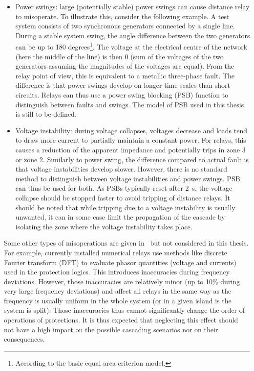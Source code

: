 \begin{itemize}
\begin{figure}
    \label{fig:encroachment}
\end{figure}
    \item Power swings: large (potentially stable) power swings can cause distance relay to misoperate. To illustrate this, consider the following example. A test system consists of two synchronous generators connected by a single line. During a stable system swing, the angle difference between the two generators can be up to 180 degrees\footnote{According to the basic equal area criterion model.}. The voltage at the electrical centre of the network (here the middle of the line) is then 0 (sum of the voltages of the two generators assuming the magnitudes of the voltages are equal). From the relay point of view, this is equivalent to a metallic three-phase fault. The difference is that power swings develop on longer time scales than short-circuits. Relays can thus use a power swing blocking (PSB) function to distinguish between faults and swings. The model of PSB used in this thesis is still to be defined.
    \item Voltage instability: during voltage collapses, voltages decrease and loads tend to draw more current to partially maintain a constant power. For relays, this causes a reduction of the apparent impedance and potentially trips in zone 3 or zone 2. Similarly to power swing, the difference compared to actual fault is that voltage instabilities develop slower. However, there is no standard method to distinguish between voltage instabilities and power swings. PSB can thus be used for both. As PSBs typically reset after 2~s, the voltage collapse should be stopped faster to avoid tripping of distance relays. It should be noted that while tripping due to a voltage instability is usually unwanted, it can in some case limit the propagation of the cascade by isolating the zone where the voltage instability takes place.
\end{itemize}

Some other types of misoperations are given in~\cite{PSRCreportProtectionMisop} but not considered in this thesis. For example, currently installed numerical relays use methods like discrete Fourier transform (DFT) to evaluate phasor quantities (voltage and currents) used in the protection logics. This introduces inaccuracies during frequency deviations. However, those inaccuracies are relatively minor (up to 10\% during very large frequency deviations) and affect all relays in the same way as the frequency is usually uniform in the whole system (or in a given island is the system is split). Those inaccuracies thus cannot significantly change the order of operations of protections. It is thus expected that neglecting this effect should not have a high impact on the possible cascading scenarios nor on their consequences.

